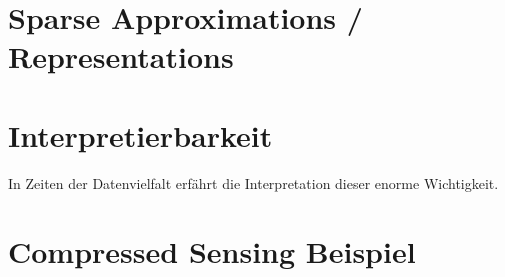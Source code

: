 \section{Sparse Approximations / Representations}

\section{Interpretierbarkeit}

In Zeiten der Datenvielfalt erfährt die Interpretation dieser enorme Wichtigkeit.

\section{Compressed Sensing Beispiel}